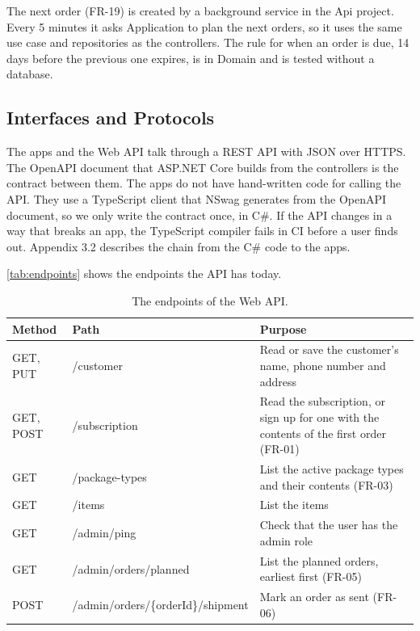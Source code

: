 The next order (FR-19) is created by a background service in the Api project. Every 5
minutes it asks Application to plan the next orders, so it uses the same use case and
repositories as the controllers. The rule for when an order is due, 14 days before the
previous one expires, is in Domain and is tested without a database.

\subsection{Interfaces and Protocols}\label{sec:arch-interfaces}

The apps and the Web API talk through a REST API with JSON over HTTPS. The OpenAPI
document that ASP.NET Core builds from the controllers is the contract between them.
The apps do not have hand-written code for calling the API. They use a TypeScript client
that NSwag generates from the OpenAPI document, so we only write the contract once, in
C\#. If the API changes in a way that breaks an app, the TypeScript compiler fails in CI
before a user finds out. Appendix 3.2 describes the chain from the C\# code to the apps.

\autoref{tab:endpoints} shows the endpoints the API has today.

\begin{table}[H]
    \centering
    \begin{tabular}{@{}l l p{6.4cm}@{}}
        \hline
        Method & Path & Purpose \\
        \hline
        GET, PUT & /customer & Read or save the customer's name, phone number and address \\
        GET, POST & /subscription & Read the subscription, or sign up for one with the contents of the first order (FR-01) \\
        GET & /package-types & List the active package types and their contents (FR-03) \\
        GET & /items & List the items \\
        GET & /admin/ping & Check that the user has the admin role \\
        GET & /admin/orders/planned & List the planned orders, earliest first (FR-05) \\
        POST & /admin/orders/\{orderId\}/shipment & Mark an order as sent (FR-06) \\
        \hline
    \end{tabular}
    \caption{The endpoints of the Web API.}
    \label{tab:endpoints}
\end{table}

